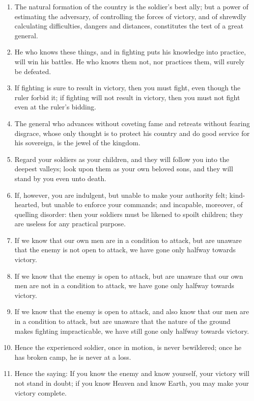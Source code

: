 \documentclass[oneside]{book}
\begin{document}
\begin{enumerate}
	\item The natural formation of the country is the soldier's best ally; but a power of estimating the adversary, of controlling the forces of victory, and of shrewdly calculating difficulties, dangers and distances, constitutes the test of a great general.
	\item He who knows these things, and in fighting puts his knowledge into practice, will win his battles. He who knows them not, nor practices them, will surely be defeated.
	\item If fighting is sure to result in victory, then you must fight, even though the ruler forbid it; if fighting will not result in victory, then you must not fight even at the ruler's bidding.
	\item The general who advances without coveting fame and retreats without fearing disgrace, whose only thought is to protect his country and do good service for his sovereign, is the jewel of the kingdom.
	\item Regard your soldiers as your children, and they will follow you into the deepest valleys; look upon them as your own beloved sons, and they will stand by you even unto death.
	\item If, however, you are indulgent, but unable to make your authority felt; kind-hearted, but unable to enforce your commands; and incapable, moreover, of quelling disorder: then your soldiers must be likened to spoilt children; they are useless for any practical purpose.
	\item If we know that our own men are in a condition to attack, but are unaware that the enemy is not open to attack, we have gone only halfway towards victory.
	\item If we know that the enemy is open to attack, but are unaware that our own men are not in a condition to attack, we have gone only halfway towards victory.
	\item If we know that the enemy is open to attack, and also know that our men are in a condition to attack, but are unaware that the nature of the ground makes fighting impracticable, we have still gone only halfway towards victory.
	\item Hence the experienced soldier, once in motion, is never bewildered; once he has broken camp, he is never at a loss.
	\item Hence the saying: If you know the enemy and know yourself, your victory will not stand in doubt; if you know Heaven and know Earth, you may make your victory complete.
\end{enumerate}
\end{document}
